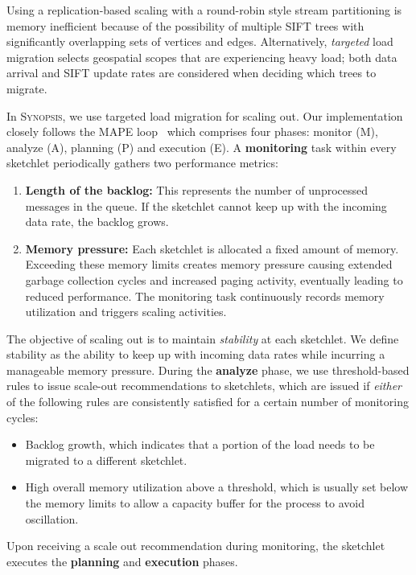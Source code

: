 \documentclass[9pt,journal,compsoc]{IEEEtran}
\begin{document}
Using a replication-based scaling with a round-robin style stream partitioning is memory inefficient because of the possibility of multiple SIFT trees with significantly overlapping sets of vertices and edges. Alternatively, \emph{targeted} load migration selects geospatial scopes that are experiencing heavy load; both data arrival and SIFT update rates are considered when deciding which trees to migrate.

In \textsc{Synopsis}, we use targeted load migration for scaling out.
Our implementation closely follows the MAPE loop~\cite{maurer2011revealing} which comprises four phases: monitor (M), analyze (A), planning (P) and execution (E).
A \textbf{monitoring} task within every sketchlet periodically gathers two performance metrics:
\begin{enumerate}[leftmargin=*]
    \item \textbf{Length of the backlog:} This represents the number of unprocessed messages in the queue. If the sketchlet cannot keep up with the incoming data rate, the backlog grows.
    \item \textbf{Memory pressure:} Each sketchlet is allocated a fixed amount of memory. 
    Exceeding these memory limits creates memory pressure causing extended garbage collection cycles and increased paging activity, eventually leading to reduced performance.
    The monitoring task continuously records memory utilization and triggers scaling activities.
\end{enumerate} 

The objective of scaling out is to maintain \emph{stability} at each sketchlet.
We define stability as the ability to keep up with incoming data rates while incurring a manageable memory pressure.  During the \textbf{analyze} phase, we use threshold-based rules \cite{lorido2012auto} to issue scale-out recommendations to sketchlets, which are issued if \textit{either} of the following rules are consistently satisfied for a certain number of monitoring cycles:
\begin{itemize}[leftmargin=*]  
\item Backlog growth, which indicates that a portion of the load needs to be migrated to a different sketchlet.
\item High overall memory utilization above a threshold, which is usually set below the memory limits to allow a capacity buffer for the process to avoid oscillation.
\end{itemize}
Upon receiving a scale out recommendation during monitoring, the sketchlet executes the \textbf{planning} and \textbf{execution} phases.
\end{document}

